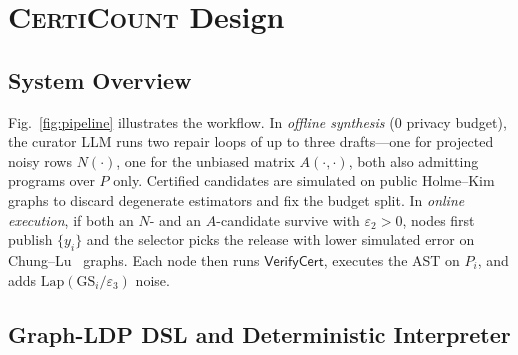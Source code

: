 \documentclass[conference]{IEEEtran}
\theoremstyle{ieeeitalic}
\newcommand{\GS}{\mathrm{GS}}
\newcommand{\Lap}{\mathrm{Lap}}
\newcommand{\VerifyCert}{\mathsf{VerifyCert}}
\begin{document}
\section{\textsc{CertiCount} Design}
\label{sec:design}

\subsection{System Overview}
\label{sec:overview}

Fig.~\ref{fig:pipeline} illustrates the workflow. In \emph{offline synthesis} ($0$ privacy budget), the curator LLM runs two repair loops of up to three drafts---one for projected noisy rows $N(\cdot)$, one for the unbiased matrix $A(\cdot,\cdot)$, both also admitting programs over $P$ only. Certified candidates are simulated on public Holme--Kim~\cite{holme2002growing} graphs to discard degenerate estimators and fix the budget split. In \emph{online execution}, if both an $N$- and an $A$-candidate survive with $\varepsilon_2 > 0$, nodes first publish $\{y_i\}$ and the selector picks the release with lower simulated error on Chung--Lu~\cite{chung2002connected} graphs. Each node then runs $\VerifyCert$, executes the AST on $P_i$, and adds $\Lap(\GS_i/\varepsilon_3)$ noise.

\subsection{Graph-LDP DSL and Deterministic Interpreter}
\label{sec:dsl}
\end{document}
